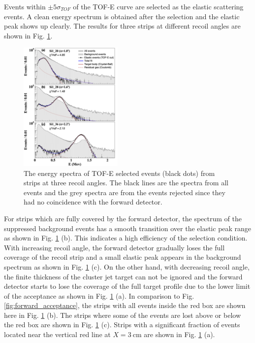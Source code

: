 \documentclass[number,5p]{elsarticle}
\begin{document}
Events within $\pm 5\sigma_{TOF}$ of the TOF-E curve are selected as the elastic
scattering events.
A clean energy spectrum is obtained after the selection and the elastic peak shows up clearly.
The results for three strips at different recoil angles are shown in Fig. \ref{fig:cut}.
\begin{figure}[b!]
  \centering
  \includegraphics[width=0.45\textwidth]{./tofe_cut_comparison.png}
  \caption{The energy spectra of TOF-E selected events (black dots) from strips at three recoil angles. The black lines are the spectra from all events and the grey spectra are from the events rejected since they had no coincidence with the forward detector.}
  \label{fig:cut}
\end{figure}
For strips which are fully covered by the forward detector, the spectrum of the
suppressed background events has a smooth transition over the elastic peak range
as shown in Fig. \ref{fig:cut} (b).
This indicates a high efficiency of the selection condition.
With increasing recoil angle, the forward detector gradually loses the full coverage
of the recoil strip and a small elastic peak appears in the background spectrum
as shown in Fig. \ref{fig:cut} (c).
On the other hand, with decreasing recoil angle, the finite thickness of the
cluster jet target can not be ignored and the forward detector starts to lose the coverage of the full target profile due
to the lower limit of the acceptance as shown in Fig. \ref{fig:cut} (a).
In comparison to Fig. \ref{fig:forward_acceptance}, the strips with all events
inside the red box are shown here in Fig. \ref{fig:cut} (b).
The strips where some of the events are lost above or below the red box are
shown in Fig. \ref{fig:cut} (c).
Strips with a significant fraction of events located near the vertical red line
at $X = \SI{3}{\cm}$ are shown in Fig. \ref{fig:cut} (a).
\end{document}
